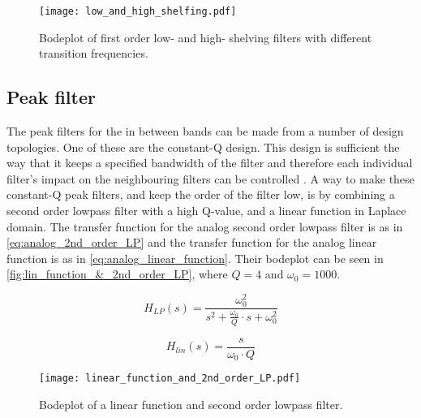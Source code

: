 \begin{figure}
    \centering
        \texttt{[image: low\_and\_high\_shelfing.pdf]}
        \caption{Bodeplot of first order low- and high- shelving filters with different transition frequencies.}
        \label{fig:low_and_high_shelving}
  \end{figure} 

\subsection{Peak filter}
The peak filters for the in between bands can be made from a number of design topologies. One of these are the constant-Q design. This design is sufficient the way that it keeps a specified bandwidth of the filter and therefore each individual filter's impact on the neighbouring filters can be controlled \citep{constant_Q}.
A way to make these constant-Q peak filters, and keep the order of the filter low, is by combining a second order lowpass filter with a high Q-value, and a linear function in Laplace domain.
The transfer function for the analog second order lowpass filter is as in \autoref{eq:analog_2nd_order_LP} and the transfer function for the analog linear function is as in \autoref{eq:analog_linear_function}. Their bodeplot can be seen in \autoref{fig:lin_function_&_2nd_order_LP}, where $Q = 4$ and $\omega_0 = 1000$. 

\begin{equation}\label{eq:analog_2nd_order_LP}
        H_{LP}(s) = \frac{\omega_0^2}{s^2+\frac{\omega_0}{Q}\cdot s + \omega_0^2}
    \end{equation}

    \startexplain
    \stopexplain

\begin{equation}\label{eq:analog_linear_function}
        H_{lin}(s) = \frac{s}{\omega_0 \cdot Q}
    \end{equation}
    
\begin{figure}
    \centering
        \texttt{[image: linear\_function\_and\_2nd\_order\_LP.pdf]}
        \caption{Bodeplot of a linear function and second order lowpass filter.}
        \label{fig:lin_function_&_2nd_order_LP}
  \end{figure} 

